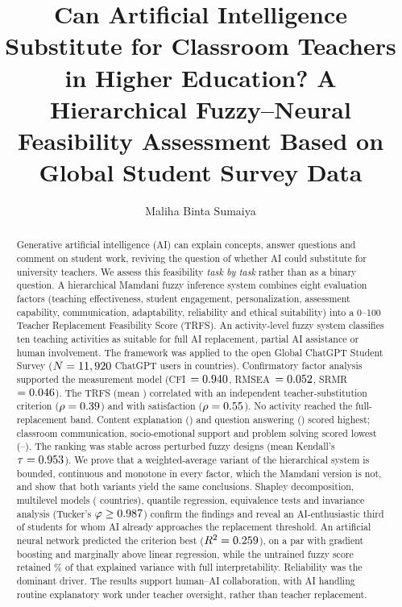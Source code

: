 \documentclass[preprint,12pt,authoryear]{elsarticle}
\theoremstyle{remark}
\begin{document}
\begin{frontmatter}

\title{Can Artificial Intelligence Substitute for Classroom Teachers in Higher Education? A Hierarchical Fuzzy--Neural Feasibility Assessment Based on Global Student Survey Data}

\author{Maliha Binta Sumaiya}
\address{Department of Computer Science and Engineering, [University name], [City], [Country]}

\begin{abstract}
Generative artificial intelligence (AI) can explain concepts, answer questions and comment on student work, reviving the question of whether AI could substitute for university teachers. We assess this feasibility \emph{task by task} rather than as a binary question. A hierarchical Mamdani fuzzy inference system combines eight evaluation factors (teaching effectiveness, student engagement, personalization, assessment capability, communication, adaptability, reliability and ethical suitability) into a 0--100 Teacher Replacement Feasibility Score (TRFS). An activity-level fuzzy system classifies ten teaching activities as suitable for full AI replacement, partial AI assistance or human involvement. The framework was applied to the open Global ChatGPT Student Survey ($N=11,920$ ChatGPT users in \Ncountries{} countries). Confirmatory factor analysis supported the measurement model (CFI~$=0.940$, RMSEA~$=0.052$, SRMR~$=0.046$). The TRFS (mean \TRFSmean) correlated with an independent teacher-substitution criterion ($\rho=0.39$) and with satisfaction ($\rho=0.55$). No activity reached the full-replacement band. Content explanation () and question answering () scored highest; classroom communication, socio-emotional support and problem solving scored lowest (--). The ranking was stable across \RobDraws{} perturbed fuzzy designs (mean Kendall's $\tau=0.953$). We prove that a weighted-average variant of the hierarchical system is bounded, continuous and monotone in every factor, which the Mamdani version is not, and show that both variants yield the same conclusions. Shapley decomposition, multilevel models (\MlCountries{} countries), quantile regression, equivalence tests and invariance analysis (Tucker's $\varphi\ge0.987$) confirm the findings and reveal an AI-enthusiastic third of students for whom AI already approaches the replacement threshold. An artificial neural network predicted the criterion best ($R^2=0.259$), on a par with gradient boosting and marginally above linear regression, while the untrained fuzzy score retained \FisShare\% of that explained variance with full interpretability. Reliability was the dominant driver. The results support human--AI collaboration, with AI handling routine explanatory work under teacher oversight, rather than teacher replacement.
\end{abstract}


\end{frontmatter}
\end{document}

